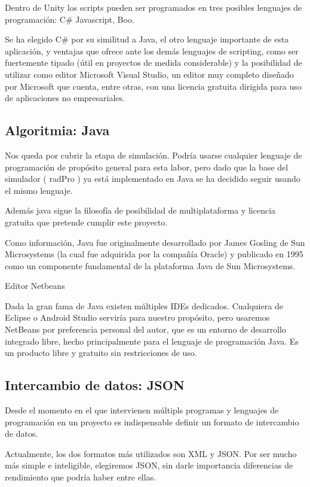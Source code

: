 \documentclass[12pt,a4paper,openright,oneside]{article}
\numberwithin{equation}{section}
\theoremstyle{definition}
\begin{document}
Dentro de Unity los scripts pueden ser programados en tres posibles lenguajes de programación: C\# Javascript, Boo.

Se ha elegido C\# por su similitud a Java, el otro lenguaje importante de esta aplicación, y ventajas que ofrece ante los demás lenguajes de scripting, como ser fuertemente tipado (útil en proyectos de medida considerable) y la posibilidad de utilizar como editor Microsoft Visual Studio, un editor muy completo diseñado por Microsoft que cuenta, entre otras, con una licencia gratuita dirigida para uso de aplicaciones no empresariales.

\subsection{Algoritmia: Java}

Nos queda por cubrir la etapa de simulación. Podría usarse cualquier lenguaje de programación de propósito general para esta labor, pero dado que la base del simulador ( radPro ) ya está implementado en Java se ha decidido seguir usando el mismo lenguaje.

Además java sigue la filosofía de posibilidad de multiplataforma y licencia gratuita que pretende cumplir este proyecto.

Como información, Java fue originalmente desarrollado por James Gosling de Sun Microsystems (la cual fue adquirida por la compañía Oracle) y publicado en 1995 como un componente fundamental de la plataforma Java de Sun Microsystems. 

Editor Netbeans

Dada la gran fama de Java existen múltiples IDEs dedicados. Cualquiera de Eclipse o Android Studio serviría para nuestro propósito, pero usaremos NetBeans por preferencia personal del autor, que es un entorno de desarrollo integrado libre, hecho principalmente para el lenguaje de programación Java. Es un producto libre y gratuito sin restricciones de uso.

\subsection{Intercambio de datos: JSON}
Desde el momento en el que intervienen múltipls programas y lenguajes de programación en un proyecto es indispensable definir un formato de intercambio de datos.

Actualmente, los dos formatos más utilizados son XML y JSON. Por ser mucho más simple e inteligible, elegiremos JSON, sin darle importancia diferencias de rendimiento que podría haber entre ellas. 
\end{document}
